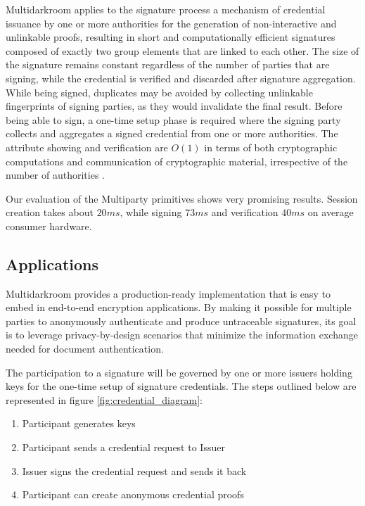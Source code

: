 \documentclass[twocolumn]{article}
\begin{document}
Multidarkroom applies to the signature process a mechanism of credential
issuance by one or more authorities for the generation of
non-interactive and unlinkable proofs, resulting in short and
computationally efficient signatures composed of exactly two group
elements that are linked to each other. The size of the signature
remains constant regardless of the number of parties that are signing,
while the credential is verified and discarded after signature
aggregation. While being signed, duplicates may be avoided by collecting
unlinkable fingerprints of signing parties, as they would invalidate the
final result. Before being able to sign, a one-time setup phase is
required where the signing party collects and aggregates a signed
credential from one or more authorities. The attribute showing and
verification are $O(1)$ in terms of both cryptographic computations and
communication of cryptographic material, irrespective of the number of
authorities \citep{coconut-2018}.

Our evaluation of the Multiparty primitives shows very promising
results. Session creation takes about $20ms$, while signing $73ms$ and
verification $40ms$ on average consumer hardware.

\subsection*{Applications}

Multidarkroom provides a production-ready implementation that is easy to embed in end-to-end encryption applications. By making it possible for multiple parties to anonymously authenticate and produce untraceable signatures, its goal is to leverage privacy-by-design scenarios that minimize the information exchange needed for document authentication.

The participation to a signature will be governed by one or more issuers holding keys for the one-time setup of signature credentials. The steps outlined below are represented in figure \ref{fig:credential_diagram}:

\begin{enumerate} %
  \item Participant generates keys
  \item Participant sends a credential request to Issuer
  \item Issuer signs the credential request and sends it back
  \item Participant can create anonymous credential proofs
\end{enumerate}
\end{document}
